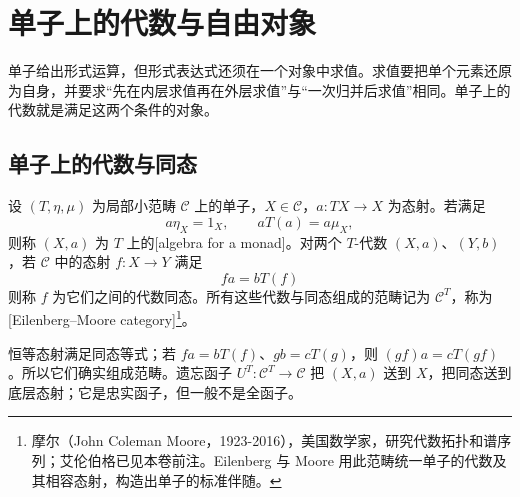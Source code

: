 

\section{单子上的代数与自由对象}
\label{b4:sec:A02}

单子给出形式运算，但形式表达式还须在一个对象中求值。求值要把单个元素还原为自身，并要求“先在内层求值再在外层求值”与“一次归并后求值”相同。单子上的代数就是满足这两个条件的对象。

\subsection{单子上的代数与同态}
\label{b4:subsec:A02:01}

\begin{definition}\label{b4:def:A-monad-algebra}
	设 \((T,\eta,\mu)\) 为局部小范畴 \(\mathcal C\) 上的单子，\(X\in\mathcal C\)，\(a:TX\to X\) 为态射。若满足
	\begin{equation}\label{b4:eq:A-algebra-laws}
		a\eta_X=1_X,\qquad aT(a)=a\mu_X,
	\end{equation}
	则称 \((X,a)\) 为 \(T\) 上的[algebra for a monad]。对两个 \(T\)-代数 \((X,a)\)、\((Y,b)\)，若 \(\mathcal C\) 中的态射 \(f:X\to Y\) 满足
	\[
		fa=bT(f)
	\]
	则称 \(f\) 为它们之间的代数同态。所有这些代数与同态组成的范畴记为 \(\mathcal C^T\)，称为 [Eilenberg--Moore category]\footnote{摩尔（John Coleman Moore，1923-2016），美国数学家，研究代数拓扑和谱序列；艾伦伯格已见本卷前注。Eilenberg 与 Moore 用此范畴统一单子的代数及其相容态射，构造出单子的标准伴随。}。
\end{definition}

恒等态射满足同态等式；若 \(f a=bT(f)\)、\(g b=cT(g)\)，则 \((gf)a=cT(gf)\)。所以它们确实组成范畴。遗忘函子 \(U^T:\mathcal C^T\to\mathcal C\) 把 \((X,a)\) 送到 \(X\)，把同态送到底层态射；它是忠实函子，但一般不是全函子。

